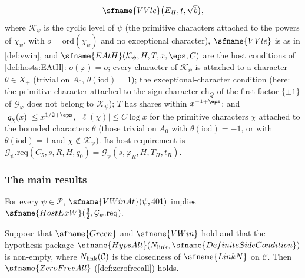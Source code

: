 \begin{definition}
\begin{enumerate}[label=(\roman*)]
\[\sfname{VVle}\big(E_H,t,\sqrt{b}\big),
\]
where $\mathcal K_\psi$ is the cyclic level of $\psi$ (the primitive characters attached to the powers of
$\chi_\psi$, with $o=\mathrm{ord}(\chi_\psi)$ and no exceptional character), $\sfname{VVle}$ is as in \cref{def:vwin}, and
$\sfname{EAtH}(\mathcal K_\psi,H,T,x,\eps,C)$ are the host conditions of \cref{def:hosts:EAtH}: $o(\varphi)=o$; every
character of $\mathcal K_\psi$ is attached to a character $\theta\in X_+$ (trivial on $A_0$, $\theta(\mathrm{iod})=1$);
the exceptional-character condition (here: the primitive character attached to the sign character $\mathrm{ch}_Q$ of the first
factor $\{\pm1\}$ of $\mathcal G_\varphi$ does not belong to $\mathcal K_\psi$); $T$ has shares within $x^{-1+\eps}$; and $|g_\chi(x)|\le x^{1/2+\eps}$, $|\ell(\chi)|\le C\log x$ for the
primitive characters $\chi$ attached to the bounded characters $\theta$ (those trivial on $A_0$ with
$\theta(\mathrm{iod})=-1$, or with $\theta(\mathrm{iod})=1$ and $\chi\notin\mathcal K_\psi$). Its host requirement is
$\mathcal G_\psi.\mathrm{req}(C_5,s,R,H,q_0)=\mathcal G_\psi(s,\varphi_R,H,T_H,t_R)$.
\end{enumerate}
  
  
\end{definition}

\subsubsection{The main results}

\begin{theorem}\label{pf:top-supply:main}
For every $\psi\in\mathcal P$, $\sfname{VWinAt}(\psi,401)$ implies
$\sfname{HostExW}(\frac32,\mathcal G_\psi.\mathrm{req})$. 
\end{theorem}

\begin{theorem}\label{pf:top-supply:root}
Suppose that $\sfname{Green}$ and $\sfname{VWin}$ hold and that the hypothesis package
$\sfname{HypsAlt}(N_{\rm link},\sfname{DefiniteSideCondition})$ is non-empty, where
$N_{\rm link}(\mathcal C)$ is the closedness of $\sfname{LinkN}$ on $\mathcal C$. Then $\sfname{ZeroFreeAll}$
(\cref{def:zerofreeall}) holds. 
\end{theorem}

